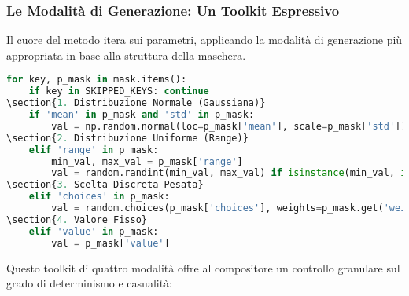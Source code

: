 \subsubsection{Le Modalità di Generazione: Un Toolkit Espressivo}
Il cuore del metodo itera sui parametri, applicando la modalità di generazione più appropriata in base alla struttura della maschera.

\begin{lstlisting}[language=Python]
for key, p_mask in mask.items():
    if key in SKIPPED_KEYS: continue
\section{1. Distribuzione Normale (Gaussiana)}
    if 'mean' in p_mask and 'std' in p_mask:
        val = np.random.normal(loc=p_mask['mean'], scale=p_mask['std'])
\section{2. Distribuzione Uniforme (Range)}
    elif 'range' in p_mask:
        min_val, max_val = p_mask['range']
        val = random.randint(min_val, max_val) if isinstance(min_val, int) else random.uniform(min_val, max_val)
\section{3. Scelta Discreta Pesata}
    elif 'choices' in p_mask:
        val = random.choices(p_mask['choices'], weights=p_mask.get('weights'), k=1)[0]
\section{4. Valore Fisso}
    elif 'value' in p_mask:
        val = p_mask['value']
\end{lstlisting}

Questo toolkit di quattro modalità offre al compositore un controllo granulare sul grado di determinismo e casualità:

